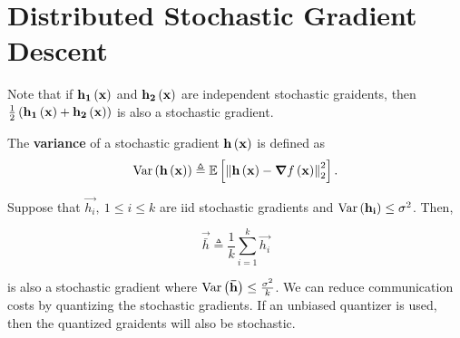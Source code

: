 \documentclass[twoside]{article}
\begin{document}



\section{Distributed Stochastic Gradient Descent}

Note that if \(\boldsymbol{\mathbf{h_1}}\left(\boldsymbol{\mathbf{x}}\right)\) and \(\boldsymbol{\mathbf{h_2}}\left(\boldsymbol{\mathbf{x}}\right)\) are
independent stochastic graidents, then
\(\frac{1}{2}\left(\boldsymbol{\mathbf{h_1}}\left(\boldsymbol{\mathbf{x}}\right) + \boldsymbol{\mathbf{h_2}}\left(\boldsymbol{\mathbf{x}}\right)\right)\) is also
a stochastic gradient.

\begin{definition}
    The \textbf{variance} of a stochastic gradient \(\boldsymbol{\mathbf{h}}\left(\boldsymbol{\mathbf{x}}\right)\) is
    defined as
    \begin{equation}
        \mathrm{Var}\left(\boldsymbol{\mathbf{h}}\left(\boldsymbol{\mathbf{x}}\right)\right) \triangleq \mathbb{E}\left[ \left\lVert\boldsymbol{\mathbf{h}}\left(\boldsymbol{\mathbf{x}}\right)-\boldsymbol{\mathbf{\nabla}}f\left(\boldsymbol{\mathbf{x}}\right)\right\rVert^2_2 \right].
        \label{eq:sg-var-def}
    \end{equation}
\end{definition}

Suppose that \(\vec{h_i},\ 1 \le i \le k\) are iid stochastic gradients and
\(\mathrm{Var}\left(\boldsymbol{\mathbf{h_i}}\right) \le \sigma^2\). Then,

\begin{equation}
    \vec{\bar{h}} \triangleq \frac{1}{k}\sum_{i=1}^k\vec{h_i}
    \label{eq:hbar-def}
\end{equation}

is also a stochastic gradient where \(\mathrm{Var}\left(\boldsymbol{\mathbf{\bar{h}}}\right) \le
\frac{\sigma^2}{k}\). We can reduce communication costs by quantizing the
stochastic gradients. If an unbiased quantizer is used, then the quantized
graidents will also be stochastic.
\end{document}
